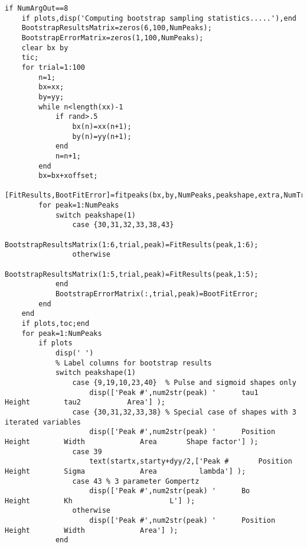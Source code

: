 \begin{lstlisting}
if NumArgOut==8
    if plots,disp('Computing bootstrap sampling statistics.....'),end
    BootstrapResultsMatrix=zeros(6,100,NumPeaks);
    BootstrapErrorMatrix=zeros(1,100,NumPeaks);
    clear bx by
    tic;
    for trial=1:100
        n=1;
        bx=xx;
        by=yy;
        while n<length(xx)-1
            if rand>.5
                bx(n)=xx(n+1);
                by(n)=yy(n+1);
            end
            n=n+1;
        end
        bx=bx+xoffset;
        [FitResults,BootFitError]=fitpeaks(bx,by,NumPeaks,peakshape,extra,NumTrials,start,AUTOZERO,FIXEDPARAMETERS,shapesvector);
        for peak=1:NumPeaks
            switch peakshape(1)
                case {30,31,32,33,38,43}
                    BootstrapResultsMatrix(1:6,trial,peak)=FitResults(peak,1:6);
                otherwise
                    BootstrapResultsMatrix(1:5,trial,peak)=FitResults(peak,1:5);
            end
            BootstrapErrorMatrix(:,trial,peak)=BootFitError;
        end
    end
    if plots,toc;end
    for peak=1:NumPeaks
        if plots
            disp(' ')
            % Label columns for bootstrap results
            switch peakshape(1)
                case {9,19,10,23,40}  % Pulse and sigmoid shapes only
                    disp(['Peak #',num2str(peak) '      tau1     Height        tau2           Area'] );
                case {30,31,32,33,38} % Special case of shapes with 3 iterated variables
                    disp(['Peak #',num2str(peak) '      Position      Height        Width             Area       Shape factor'] );
                case 39
                    text(startx,starty+dyy/2,['Peak #       Position    Height        Sigma             Area          lambda'] );    
                case 43 % 3 parameter Gompertz
                    disp(['Peak #',num2str(peak) '      Bo         Height        Kh                       L'] );
                otherwise
                    disp(['Peak #',num2str(peak) '      Position     Height        Width             Area'] );
            end
            

\end{lstlisting}
